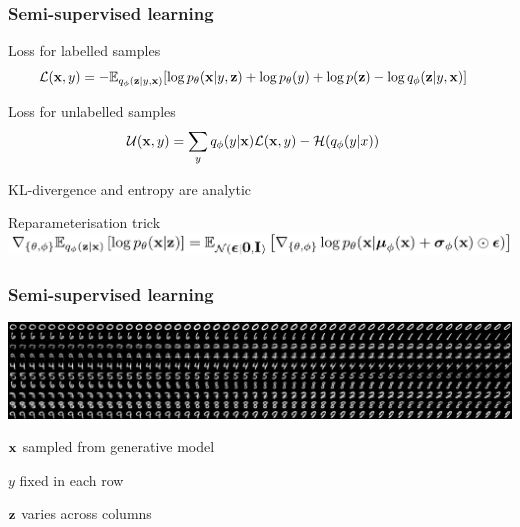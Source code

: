 \documentclass[10pt]{beamer}
\begin{document}
\begin{frame}
  \frametitle{Semi-supervised learning}

  Loss for labelled samples
  \begin{align*}
    \mathcal{L}(\boldsymbol{\mathbf{x}},y) &=
      - \mathbb{E}_{q_\phi(\boldsymbol{\mathbf{z}}|y, \boldsymbol{\mathbf{x}})}[
        \log p_\theta(\boldsymbol{\mathbf{x}}|y, \boldsymbol{\mathbf{z}})
        + \log p_\theta(y)
        + \log p(\boldsymbol{\mathbf{z}})
        - \log q_\phi(\boldsymbol{\mathbf{z}}|y, \boldsymbol{\mathbf{x}})]
  \end{align*}

  Loss for unlabelled samples
  \begin{align*}
    \mathcal{U}(\boldsymbol{\mathbf{x}},y) &=
      \sum_y q_\phi(y|\boldsymbol{\mathbf{x}}) \mathcal{L}(\boldsymbol{\mathbf{x}}, y)
      - \mathcal{H}(q_\phi(y|x))
  \end{align*}

  KL-divergence and entropy are analytic

  \begin{block}{Reparameterisation trick}
    \includegraphics[width=\textwidth]{img/reparameterisation-trick}
  \end{block}
\end{frame}



\begin{frame}
  \frametitle{Semi-supervised learning}
  \includegraphics[width=\textwidth]{img/semi-M2-072}

  $\boldsymbol{\mathbf{x}}$ sampled from generative model

  $y$ fixed in each row

  $\boldsymbol{\mathbf{z}}$ varies across columns
\end{frame}
\end{document}
